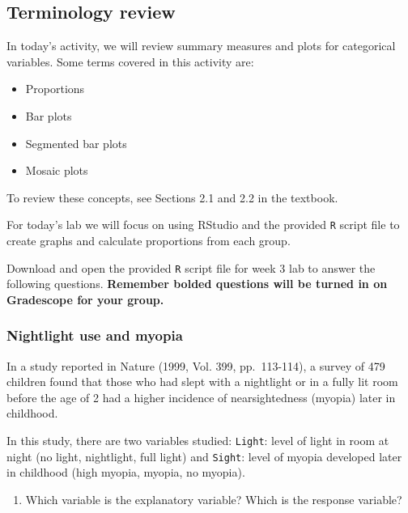 \documentclass[
]{report}
\providecommand{\tightlist}{%
  \setlength{\itemsep}{0pt}\setlength{\parskip}{0pt}}
\begin{document}
\hypertarget{terminology-review-6}{%
\subsection{Terminology review}\label{terminology-review-6}}

In today's activity, we will review summary measures and plots for categorical variables. Some terms covered in this activity are:

\begin{itemize}
\item
  Proportions
\item
  Bar plots
\item
  Segmented bar plots
\item
  Mosaic plots
\end{itemize}

To review these concepts, see Sections 2.1 and 2.2 in the textbook.

For today's lab we will focus on using RStudio and the provided \texttt{R} script file to create graphs and calculate proportions from each group.

Download and open the provided \texttt{R} script file for week 3 lab to answer the following questions. \textbf{Remember bolded questions will be turned in on Gradescope for your group.}

\hypertarget{nightlight-use-and-myopia}{%
\subsubsection{Nightlight use and myopia}\label{nightlight-use-and-myopia}}

In a study reported in Nature (1999, Vol. 399, pp.~113-114), a survey of 479 children found that those who had slept with a nightlight or in a fully lit room before the age of 2 had a higher incidence of nearsightedness (myopia) later in childhood.

In this study, there are two variables studied: \texttt{Light}: level of light in room at night (no light, nightlight, full light) and \texttt{Sight}: level of myopia developed later in childhood (high myopia, myopia, no myopia).

\begin{enumerate}
\def\labelenumi{\arabic{enumi}.}
\tightlist
\item
  Which variable is the explanatory variable? Which is the response variable?
\end{enumerate}

\vspace{0.8in}
\end{document}
